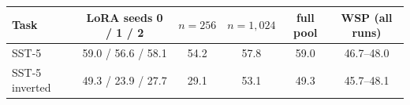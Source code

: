 \begin{tabular}{lccccc}
\toprule
Task & LoRA seeds 0 / 1 / 2 & $n=256$ & $n=1{,}024$ & full pool & WSP (all runs) \\
\midrule
SST-5 & 59.0 / 56.6 / 58.1 & 54.2 & 57.8 & 59.0 & 46.7--48.0 \\
SST-5 inverted & 49.3 / 23.9 / 27.7 & 29.1 & 53.1 & 49.3 & 45.7--48.1 \\
\bottomrule
\end{tabular}
